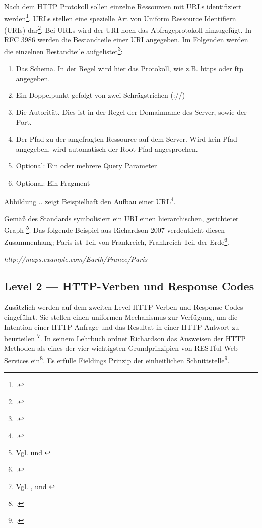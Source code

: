 Nach dem HTTP Protokoll sollen einzelne Ressourcen mit URLs identifiziert werden\footcite[Vgl. ][S. 18]{fielding_hypertext_1999}. URLs stellen eine spezielle Art von Uniform Ressource Identifiern (URIs) dar\footcite[Vgl. ]{berners-lee_uniform_2005-1}. Bei URLs wird der URI noch das Abfrageprotokoll hinzugefügt. In RFC 3986 werden die Bestandteile einer URI angegeben. Im Folgenden werden die einzelnen Bestandteile aufgelistet\footcite[Vgl. ][S. 6ff]{berners-lee_uniform_2005-1}:

\begin{enumerate}
    \item Das Schema. In der Regel wird hier das Protokoll, wie z.B. https oder ftp angegeben.
    \item Ein Doppelpunkt gefolgt von zwei Schrägstrichen (://)
    \item Die Autorität. Dies ist in der Regel der Domainname des Server, sowie der Port.
    \item Der Pfad zu der angefragten Ressource auf dem Server. Wird kein Pfad angegeben, wird automatisch der Root Pfad angesprochen.
    \item Optional: Ein oder mehrere Query Parameter
    \item Optional: Ein Fragment
\end{enumerate}

Abbildung .. zeigt Beispielhaft den Aufbau einer URL\footcite[Vgl. ][S. 16]{berners-lee_uniform_2005-1}. 

Gemäß des Standards symbolisiert ein URI einen hierarchischen, gerichteter Graph \footnote{Vgl. \cite[S. 118]{richardson_restful_2007} und \cite[S. 175]{palma_semantic_2017}}. Das folgende Beispiel aus Richardson 2007 verdeutlicht diesen Zusammenhang; Paris ist Teil von Frankreich, Frankreich Teil der Erde\footcite[Vgl. ][S. 118]{richardson_restful_2007}.

\emph{http://maps.example.com/Earth/France/Paris}

\subsection{Level 2 — HTTP-Verben und Response Codes}\label{subsection:level-2}

Zusätzlich werden auf dem zweiten Level HTTP-Verben und Response-Codes eingeführt. Sie stellen einen uniformen Mechanismus zur Verfügung, um die Intention einer HTTP Anfrage und das Resultat in einer HTTP Antwort zu beurteilen \footnote{Vgl. \cite[S. 15]{haupt_conversation_2015}, \cite[S. 237]{franch_detection_2014} und \cite[S. 23]{masse_rest_2012}}. In seinem Lehrbuch ordnet Richardson das Ausweisen der HTTP Methoden als eines der vier wichtigsten Grundprinzipien von RESTful Web Services ein\footcite[Vgl. ][S. 105]{richardson_restful_2007}. Es erfülle Fieldings Prinzip der einheitlichen Schnittstelle\footcite[Vgl. ][S. 79]{richardson_restful_2007}.


